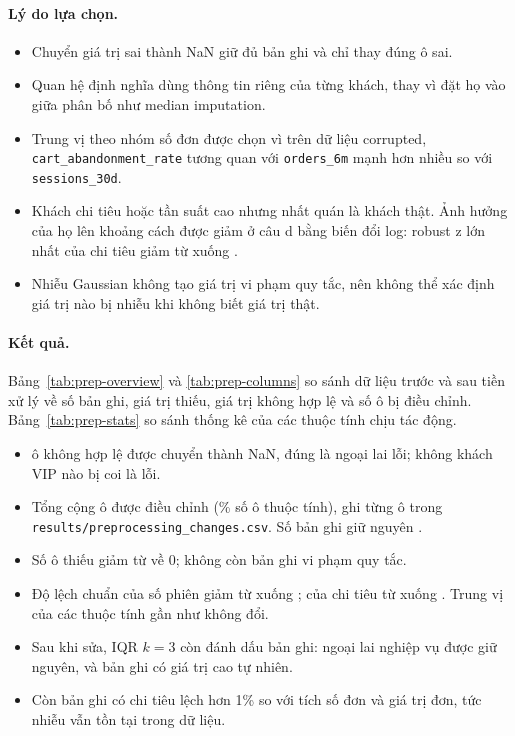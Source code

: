 \documentclass[11pt,a4paper]{article}
\begin{document}
\paragraph{Lý do lựa chọn.}
\begin{itemize}
  \item Chuyển giá trị sai thành NaN giữ đủ \NCustomers{} bản ghi và chỉ thay đúng ô sai.
  \item Quan hệ định nghĩa dùng thông tin riêng của từng khách, thay vì đặt họ vào giữa phân bố như median imputation.
  \item Trung vị theo nhóm số đơn được chọn vì trên dữ liệu corrupted, \texttt{cart\_abandonment\_rate} tương quan với \texttt{orders\_6m} mạnh hơn nhiều so với \texttt{sessions\_30d}.
  \item Khách chi tiêu hoặc tần suất cao nhưng nhất quán là khách thật. Ảnh hưởng của họ lên khoảng cách được giảm ở câu d bằng biến đổi log: robust z lớn nhất của chi tiêu giảm từ \LogZSpendRaw{} xuống \LogZSpendLog.
  \item Nhiễu Gaussian không tạo giá trị vi phạm quy tắc, nên không thể xác định giá trị nào bị nhiễu khi không biết giá trị thật.
\end{itemize}

\paragraph{Kết quả.}
Bảng~\ref{tab:prep-overview} và \ref{tab:prep-columns} so sánh dữ liệu trước và sau tiền xử lý về số bản ghi, giá trị thiếu, giá trị không hợp lệ và số ô bị điều chỉnh. Bảng~\ref{tab:prep-stats} so sánh thống kê của các thuộc tính chịu tác động.
\begin{itemize}
  \item \InvalidCells{} ô không hợp lệ được chuyển thành NaN, đúng là \OutlierError{} ngoại lai lỗi; không khách VIP nào bị coi là lỗi.
  \item Tổng cộng \ImputedCells{} ô được điều chỉnh (\AdjustedCellsPct\% số ô thuộc tính), ghi từng ô trong \texttt{results/preprocessing\_changes.csv}. Số bản ghi giữ nguyên \NCustomers.
  \item Số ô thiếu giảm từ \MissingCellsBefore{} về 0; không còn bản ghi vi phạm quy tắc.
  \item Độ lệch chuẩn của số phiên giảm từ \SessionsStdBefore{} xuống \SessionsStdAfter; của chi tiêu từ \SpendStdBefore{} xuống \SpendStdAfter. Trung vị của các thuộc tính gần như không đổi.
  \item Sau khi sửa, IQR $k=3$ còn đánh dấu \PreIqrThreeRecords{} bản ghi: \OutlierBusiness{} ngoại lai nghiệp vụ được giữ nguyên, và \PreIqrThreeNotInjected{} bản ghi có giá trị cao tự nhiên.
  \item Còn \SpendRatioDeviating{} bản ghi có chi tiêu lệch hơn 1\% so với tích số đơn và giá trị đơn, tức nhiễu vẫn tồn tại trong dữ liệu.
\end{itemize}
\end{document}
